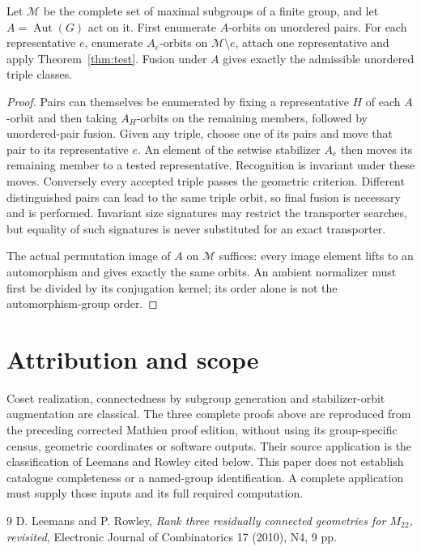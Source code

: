 \documentclass[11pt,a4paper]{article}
\newcommand{\Aut}{\operatorname{Aut}}\newcommand{\Stab}{\operatorname{Stab}}\newcommand{\cl}{\mathcal C}
\begin{document}
\begin{proposition}\label{prop:orbits}
Let $\mathcal M$ be the complete set of maximal subgroups of a finite group, and let $A=\Aut(G)$ act on it. First enumerate $A$-orbits on unordered pairs. For each representative $e$, enumerate $A_e$-orbits on $\mathcal M\setminus e$, attach one representative and apply Theorem~\ref{thm:test}. Fusion under $A$ gives exactly the admissible unordered triple classes.
\end{proposition}
\begin{proof}
Pairs can themselves be enumerated by fixing a representative $H$ of each $A$-orbit and then taking $A_H$-orbits on the remaining members, followed by unordered-pair fusion. Given any triple, choose one of its pairs and move that pair to its representative $e$. An element of the setwise stabilizer $A_e$ then moves its remaining member to a tested representative. Recognition is invariant under these moves. Conversely every accepted triple passes the geometric criterion. Different distinguished pairs can lead to the same triple orbit, so final fusion is necessary and is performed. Invariant size signatures may restrict the transporter searches, but equality of such signatures is never substituted for an exact transporter.

The actual permutation image of $A$ on $\mathcal M$ suffices: every image element lifts to an automorphism and gives exactly the same orbits. An ambient normalizer must first be divided by its conjugation kernel; its order alone is not the automorphism-group order.
\end{proof}


\section*{Attribution and scope}
Coset realization, connectedness by subgroup generation and stabilizer-orbit augmentation are classical. The three complete proofs above are reproduced from the preceding corrected Mathieu proof edition, without using its group-specific census, geometric coordinates or software outputs. Their source application is the classification of Leemans and Rowley cited below. This paper does not establish catalogue completeness or a named-group identification. A complete application must supply those inputs and its full required computation.
\begin{thebibliography}{9}
 D. Leemans and P. Rowley, \emph{Rank three residually connected geometries for $M_{22}$, revisited}, Electronic Journal of Combinatorics 17 (2010), N4, 9 pp.
\end{thebibliography}
\end{document}
